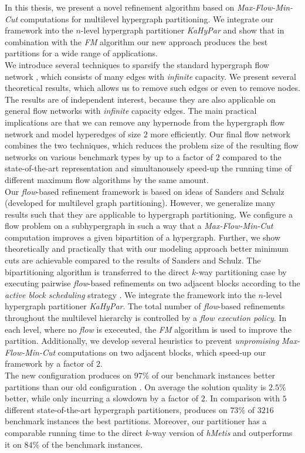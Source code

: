 In this thesis, we present a novel refinement algorithm based on \emph{Max-Flow-Min-Cut}
computations for multilevel hypergraph partitioning. We integrate our framework
into the $n$-level hypergraph partitioner \emph{KaHyPar} and show that
in combination with the \emph{FM} algorithm our new approach produces the best partitions
for a wide range of applications.\\
We introduce several techniques to 
sparsify the standard hypergraph flow network \cite{lawler1973},
which consists of many edges with \emph{infinite} capacity. We present
several theoretical results, which allows us to remove such edges or even to remove
nodes. The results are of independent interest, because they are also
applicable on general flow networks with \emph{infinite} capacity edges.
The main practical implications are that we can remove any hypernode 
from the hypergraph flow network and model hyperedges of size $2$ more efficiently. 
Our final flow network combines the two techniques, which reduces 
the problem size of the resulting flow networks on various benchmark types by up to 
a factor of $2$ compared to the state-of-the-art representation and
simultanousely speed-up the running time of different maximum flow algorithms 
by the same amount.  \\
Our \emph{flow}-based refinement framework is based on ideas of Sanders and Schulz
\cite{sanders2011engineering} (developed for multilevel graph partitioning). However,
we generalize many results such that they are applicable to hypergraph partitioning.
We configure a flow problem on a subhypergraph in such a way that a \emph{Max-Flow-Min-Cut}
computation improves a given bipartition of a hypergraph. Further, we show theoretically
and practically that with our modeling approach better minimum cuts are achievable
compared to the results of Sanders and Schulz. The bipartitioning algorithm is transferred
to the direct $k$-way partitioning case by executing pairwise \emph{flow}-based refinements
on two adjacent blocks according to the \emph{active block scheduling} strategy \cite{holtgrewe2010engineering}.
We integrate the framework into the $n$-level hypergraph partitioner \emph{KaHyPar}.
The total number of \emph{flow}-based refinements throughout the multilevel hierarchy
is controlled by a \emph{flow execution policy}. In each level, where no \emph{flow}
is execeuted, the \emph{FM} algorithm is used to improve the partition. Additionally,
we develop several heuristics to prevent \emph{unpromising} \emph{Max-Flow-Min-Cut}
computations on two adjacent blocks, which speed-up our framework
by a factor of $2$. \\
The new configuration  produces on $97\%$ of our benchmark instances
better partitions than our old configuration . On average the solution 
quality is $2.5\%$ better, while only incurring a slowdown by a factor of $2$. 
In comparison with $5$ different state-of-the-art hypergraph partitioners,  
produces on $73\%$ of $3216$ benchmark instances the best partitions. 
Moreover, our partitioner has a comparable running time to the direct $k$-way
version of \emph{hMetis} and outperforms it on $84\%$ of the benchmark instances.


